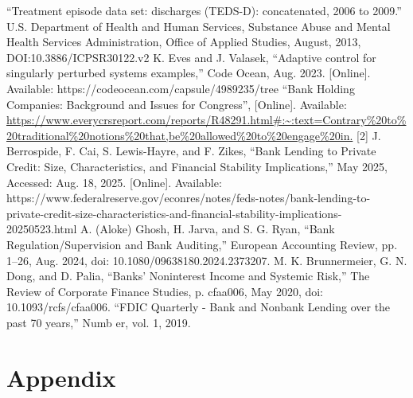 \documentclass[conference]{IEEEtran}
\begin{document}
\begin{thebibliography}{00}
 
 ``Treatment episode data set: discharges (TEDS-D): concatenated, 2006 to 2009.'' U.S. Department of Health and Human Services, Substance Abuse and Mental Health Services Administration, Office of Applied Studies, August, 2013, DOI:10.3886/ICPSR30122.v2
 K. Eves and J. Valasek, ``Adaptive control for singularly perturbed systems examples,'' Code Ocean, Aug. 2023. [Online]. Available: https://codeocean.com/capsule/4989235/tree
 “Bank Holding Companies: Background and Issues for Congress”, [Online]. Available: \url{https://www.everycrsreport.com/reports/R48291.html#:~:text=Contrary%20to%20traditional%20notions%20that,be%20allowed%20to%20engage%20in.}
[2] J. Berrospide, F. Cai, S. Lewis-Hayre, and F. Zikes, “Bank Lending to Private Credit: Size, Characteristics, and Financial Stability Implications,” May 2025, Accessed: Aug. 18, 2025. [Online]. Available: https://www.federalreserve.gov/econres/notes/feds-notes/bank-lending-to-private-credit-size-characteristics-and-financial-stability-implications-20250523.html
 A. (Aloke) Ghosh, H. Jarva, and S. G. Ryan, “Bank Regulation/Supervision and Bank Auditing,” European Accounting Review, pp. 1–26, Aug. 2024, doi: 10.1080/09638180.2024.2373207.
 M. K. Brunnermeier, G. N. Dong, and D. Palia, “Banks’ Noninterest Income and Systemic Risk,” The Review of Corporate Finance Studies, p. cfaa006, May 2020, doi: 10.1093/rcfs/cfaa006.
 “FDIC Quarterly - Bank and Nonbank Lending over the past 70 years,” Numb er, vol. 1, 2019.
\end{thebibliography}

\section{Appendix}
\end{document}
